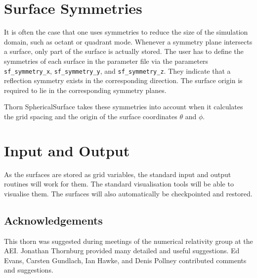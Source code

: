 \section{Surface Symmetries}

It is often the case that one uses symmetries to reduce the size of
the simulation domain, such as octant or quadrant mode.  Whenever a
symmetry plane intersects a surface, only part of the surface is
actually stored.  The user has to define the symmetries of each
surface in the parameter file via the parameters
\texttt{sf\_symmetry\_x}, \texttt{sf\_symmetry\_y}, and
\texttt{sf\_symmetry\_z}.  They indicate that a 
reflection symmetry exists in the corresponding direction.  The
surface origin is required to lie in the corresponding symmetry
planes.

Thorn SphericalSurface takes these symmetries into account when it
calculates the grid spacing and the origin of the surface coordinates
$\theta$ and $\phi$.



\section{Input and Output}

As the surfaces are stored as grid variables, the standard input and
output routines will work for them.  The standard visualisation tools
will be able to visualise them.  The surfaces will also automatically
be checkpointed and restored.



\subsection{Acknowledgements}

This thorn was suggested during meetings of the numerical relativity
group at the AEI.  Jonathan Thornburg provided many detailed and
useful suggestions.  Ed Evans, Carsten Gundlach, Ian Hawke, and Denis
Pollney contributed comments and suggestions.



